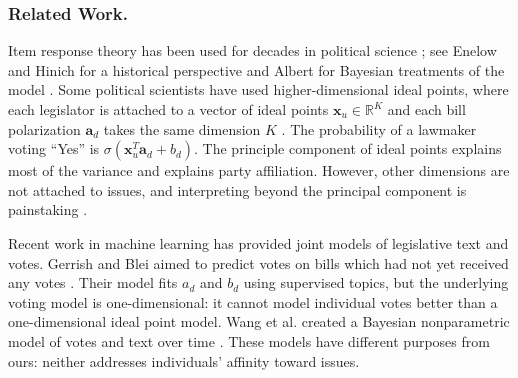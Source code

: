 


\subsubsection{Related Work.}

Item response theory has been used for decades in political science
\cite{clinton:2004,martin:2002,poole:1985}; see Enelow and Hinich for
a historical perspective \cite{enelow:1984} and Albert for Bayesian
treatments of the model \cite{albert:1992}.  Some political scientists
have used higher-dimensional ideal points, where each legislator is
attached to a vector of ideal points $\bm x_u \in \mathbb{R}^K$ and
each bill polarization $\bm a_d$ takes the same dimension $K$
\cite{heckman:1996}. The probability of a lawmaker voting ``Yes'' is
$\sigma(\bm x_u^T \bm a_d + b_d)$.  The principle component of ideal
points explains most of the variance and explains party affiliation.
However, other dimensions are not attached to issues, and
interpreting beyond the principal component is painstaking
\cite{jackman:2001}.

Recent work in machine learning has provided joint models of
legislative text and votes. Gerrish and Blei aimed to predict votes on
bills which had not yet received any votes \cite{gerrish:2011}.  Their
model fits $a_d$ and $b_d$ using supervised topics, but the underlying
voting model is one-dimensional: it cannot model individual votes
better than a one-dimensional ideal point model. Wang et al. created a
Bayesian nonparametric model of votes and text over time
\cite{wang:2010}.  These models have different purposes from ours:
neither addresses individuals' affinity toward issues.

